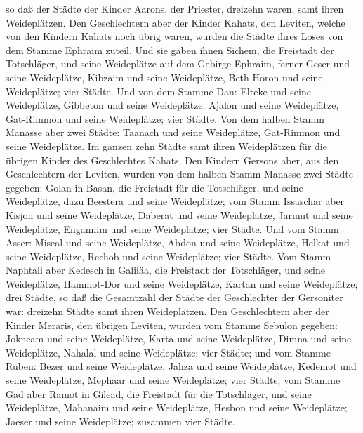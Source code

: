  so daß der Städte der Kinder Aarons, der Priester,
dreizehn waren, samt ihren Weideplätzen.  Den
Geschlechtern aber der Kinder Kahats, den Leviten, welche von den
Kindern Kahats noch übrig waren, wurden die Städte ihres Loses von dem
Stamme Ephraim zuteil.  Und sie gaben ihnen Sichem, die
Freistadt der Totschläger, und seine Weideplätze auf dem Gebirge
Ephraim, ferner Geser und seine Weideplätze,  Kibzaim und
seine Weideplätze, Beth-Horon und seine Weideplätze; vier Städte.
 Und von dem Stamme Dan: Elteke und seine Weideplätze,
Gibbeton und seine Weideplätze;  Ajalon und seine
Weideplätze, Gat-Rimmon und seine Weideplätze; vier Städte.
 Von dem halben Stamm Manasse aber zwei Städte: Taanach
und seine Weideplätze, Gat-Rimmon und seine Weideplätze. 
Im ganzen zehn Städte samt ihren Weideplätzen für die übrigen Kinder des
Geschlechtes Kahats.  Den Kindern Gersons aber, aus den
Geschlechtern der Leviten, wurden von dem halben Stamm Manasse zwei
Städte gegeben: Golan in Basan, die Freistadt für die Totschläger, und
seine Weideplätze, dazu Beestera und seine Weideplätze; 
vom Stamm Issaschar aber Kisjon und seine Weideplätze, Daberat und seine
Weideplätze,  Jarmut und seine Weideplätze, Engannim und
seine Weideplätze; vier Städte.  Und vom Stamm Asser:
Miseal und seine Weideplätze, Abdon und seine Weideplätze,
 Helkat und seine Weideplätze, Rechob und seine
Weideplätze; vier Städte.  Vom Stamm Naphtali aber
Kedesch in Galiläa, die Freistadt der Totschläger, und seine
Weideplätze, Hammot-Dor und seine Weideplätze, Kartan und seine
Weideplätze; drei Städte,  so daß die Gesamtzahl der
Städte der Geschlechter der Gersoniter war: dreizehn Städte samt ihren
Weideplätzen.  Den Geschlechtern aber der Kinder Meraris,
den übrigen Leviten, wurden vom Stamme Sebulon gegeben: Jokneam und
seine Weideplätze, Karta und seine Weideplätze,  Dimna
und seine Weideplätze, Nahalal und seine Weideplätze; vier Städte;
 und vom Stamme Ruben: Bezer und seine Weideplätze, Jahza
und seine Weideplätze,  Kedemot und seine Weideplätze,
Mephaar und seine Weideplätze; vier Städte;  vom Stamme
Gad aber Ramot in Gilead, die Freistadt für die Totschläger, und seine
Weideplätze, Mahanaim und seine Weideplätze,  Hesbon und
seine Weideplätze; Jaeser und seine Weideplätze; zusammen vier Städte.
